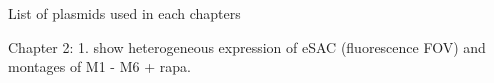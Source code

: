 List of plasmids used in each chapters

Chapter 2: 1. show heterogeneous expression of eSAC (fluorescence FOV) and montages of M1 - M6 + rapa.
